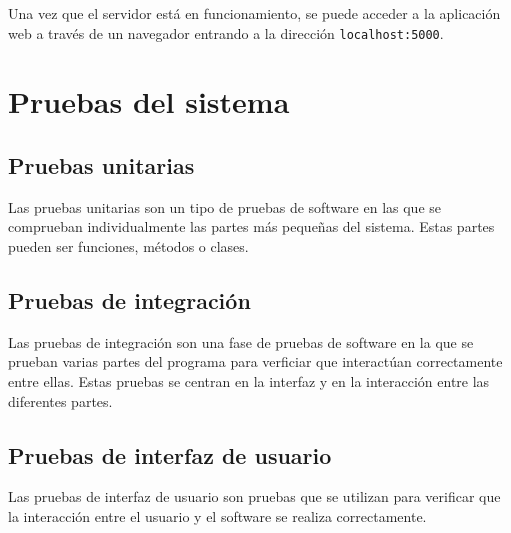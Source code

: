 Una vez que el servidor está en funcionamiento, se puede acceder a la aplicación web a través de un navegador entrando a la dirección \texttt{localhost:5000}.

\section{Pruebas del sistema}

\subsection{Pruebas unitarias}

Las pruebas unitarias son un tipo de pruebas de software en las que se comprueban individualmente las partes más pequeñas del sistema. Estas partes pueden ser funciones, métodos o clases.

\subsection{Pruebas de integración}

Las pruebas de integración son una fase de pruebas de software en la que se prueban varias partes del programa para verficiar que interactúan correctamente entre ellas. Estas pruebas se centran en la interfaz y en la interacción entre las diferentes partes.

\subsection{Pruebas de interfaz de usuario}

Las pruebas de interfaz de usuario son pruebas que se utilizan para verificar que la interacción entre el usuario y el software se realiza correctamente.